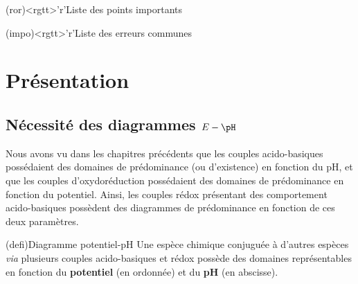 \documentclass[../../main/main.tex]{subfiles}
\begin{document}
\begin{boxes}
\begin{isd}
	\begin{tcb}(ror)<rgtt>'r'{Liste des points importants}
	\end{tcb}
	\begin{tcb}(impo)<rgtt>'r'{Liste des erreurs communes}
	\end{tcb}
  \end{isd}
\end{boxes}
\vspace*{\fill}
\newpage

\section{Présentation}
\subsection{Nécessité des diagrammes $E-\pH$}
Nous avons vu dans les chapitres précédents que les couples acido-basiques
possédaient des domaines de prédominance (ou d'existence) en fonction du pH, et
que les couples d'oxydoréduction possédaient des domaines de prédominance en
fonction du potentiel. Ainsi, les couples rédox présentant des comportement
acido-basiques possèdent des diagrammes de prédominance en fonction de ces deux
paramètres.

\begin{tcb*}(defi){Diagramme potentiel-pH}
	Une espèce chimique conjuguée à d'autres espèces \textit{via} plusieurs
	couples acido-basiques et rédox possède des domaines représentables en
	fonction du \textbf{potentiel} (en ordonnée) et du \textbf{pH} (en abscisse).
\end{tcb*}
\end{document}
